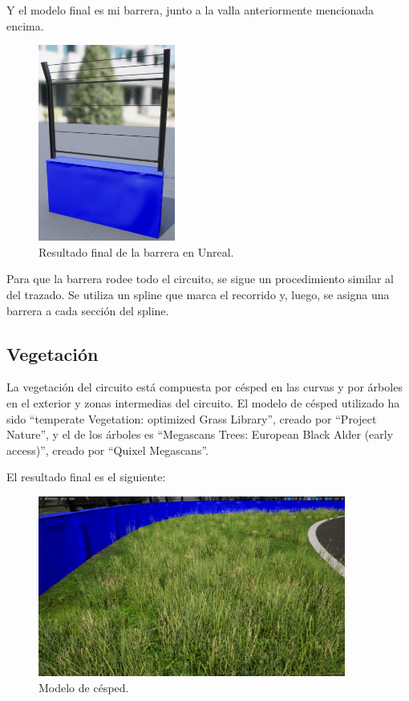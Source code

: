 Y el modelo final es mi barrera, junto a la valla anteriormente mencionada encima.

\begin{figure}[H]
    \centering
    \includegraphics[width=0.4\textwidth]{imagenes/converted/barrier/barrierfence.jpg}
    \caption{Resultado final de la barrera en Unreal.}
    \label{fig:barreraFinal}
\end{figure}

Para que la barrera rodee todo el circuito, se sigue un procedimiento similar al del trazado. Se utiliza un spline que marca el recorrido y, luego, se asigna una barrera a cada sección del spline.

\newpage

\subsection{Vegetación}

La vegetación del circuito está compuesta por césped en las curvas y por árboles en el exterior y zonas intermedias del circuito. El modelo de césped utilizado ha sido ``temperate Vegetation: optimized Grass Library''\cite{grass}, creado por ``Project Nature'', y el de los árboles es ``Megascans Trees: European Black Alder (early access)''\cite{trees}, creado por ``Quixel Megascans''.

\bigskip

El resultado final es el siguiente:

\begin{figure}[H]
    \centering
    \includegraphics[width=0.9\textwidth]{imagenes/converted/cesped.jpg}
    \caption{Modelo de césped.}
    \label{fig:cesped}
\end{figure}

